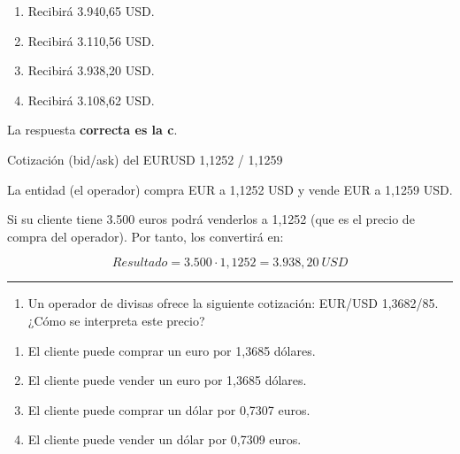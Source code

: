 \documentclass[
  letterpaper,
  DIV=11,
  numbers=noendperiod]{scrreprt}
\providecommand{\tightlist}{%
  \setlength{\itemsep}{0pt}\setlength{\parskip}{0pt}}\usepackage{longtable,booktabs,array}
\begin{document}
\begin{enumerate}
\def\labelenumi{\alph{enumi}.}
\item
  Recibirá 3.940,65 USD.
\item
  Recibirá 3.110,56 USD.
\item
  Recibirá 3.938,20 USD.
\item
  Recibirá 3.108,62 USD.
\end{enumerate}

\begin{tcolorbox}[enhanced jigsaw, left=2mm, opacityback=0, colback=white, breakable, arc=.35mm, bottomrule=.15mm, rightrule=.15mm, toprule=.15mm, leftrule=.75mm, colframe=quarto-callout-tip-color-frame]
\begin{minipage}[t]{5.5mm}
\textcolor{quarto-callout-tip-color}{\faLightbulb}
\end{minipage}%
\begin{minipage}[t]{\textwidth - 5.5mm}

La respuesta \textbf{correcta es la c}.

Cotización (bid/ask) del EURUSD 1,1252 / 1,1259

La entidad (el operador) compra EUR a 1,1252 USD y vende EUR a 1,1259
USD.

Si su cliente tiene 3.500 euros podrá venderlos a 1,1252 (que es el
precio de compra del operador). Por tanto, los convertirá en:

\[Resultado=3.500 \cdot 1,1252=3.938,20\ USD\]

\end{minipage}%
\end{tcolorbox}

\begin{center}\rule{0.5\linewidth}{0.5pt}\end{center}

\begin{enumerate}
\def\labelenumi{\arabic{enumi}.}
\setcounter{enumi}{49}
\tightlist
\item
  Un operador de divisas ofrece la siguiente cotización: EUR/USD
  1,3682/85. ¿Cómo se interpreta este precio?
\end{enumerate}

\begin{enumerate}
\def\labelenumi{\alph{enumi}.}
\item
  El cliente puede comprar un euro por 1,3685 dólares.
\item
  El cliente puede vender un euro por 1,3685 dólares.
\item
  El cliente puede comprar un dólar por 0,7307 euros.
\item
  El cliente puede vender un dólar por 0,7309 euros.
\end{enumerate}
\end{document}
